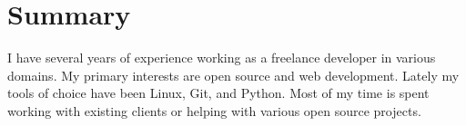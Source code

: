 \section{Summary} %
  I have several years of experience working as a freelance developer in various domains.
  My primary interests are open source and web development.
  Lately my tools of choice have been Linux, Git, and Python.
  Most of my time is spent working with existing clients or helping with various open source projects.
